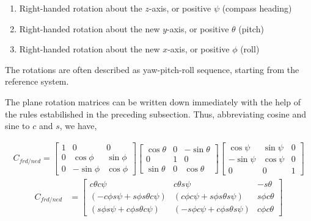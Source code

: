\begin{enumerate}
    \item Right-handed rotation about the \(z\)-axis, or positive \(\psi\) (compass heading)
    \item Right-handed rotation about the new \(y\)-axis, or positive \(\theta\) (pitch)
    \item Right-handed rotation about the new \(x\)-axis, or positive \(\phi\) (roll)
\end{enumerate}

The rotations are often described as yaw-pitch-roll sequence,
starting from the reference system.

The plane rotation matrices can be written down immediately with
the help of the rules estabilished in the preceding subsection.
Thus, abbreviating cosine and sine to \(c\) and \(s\), we have,

\begin{align*}
    C_{f\!r\!d\!/\!n\!e\!d} =
    \begin{bmatrix}
        1               &  0            &  0             \\
        0               &  \cos{\phi}   &  \sin{\phi}    \\
        0               & -\sin{\phi}   &  \cos{\phi}
    \end{bmatrix}
    \begin{bmatrix}
        \cos{ \theta}   &  0            & -\sin{\theta} \\
        0               &  1            &  0            \\
        \sin{ \theta}   &  0            &  \cos{\theta}
    \end{bmatrix}
    \begin{bmatrix}
        \cos{\psi}      &  \sin{\psi}   &  0             \\
       -\sin{\psi}      &  \cos{\psi}   &  0             \\
        0               &  0            &  1
    \end{bmatrix}
\end{align*}
\begin{align} \tag{1.3-10}
    C_{f\!r\!d\!/\!n\!e\!d} &=
    \begin{bmatrix}
        c\theta c\psi   & c\theta s\psi & -s\theta    \\
        \left(-c\phi s\psi + s\phi s\theta c\psi \right) 
        &  \left( c\phi c\psi + s\phi s\theta s\psi \right) 
        &  s\phi c\theta                                 \\
        \left( s\phi s\psi + c\phi s\theta c\psi \right) 
        &  \left( -s\phi c\psi + c\phi s\theta s\psi \right) 
        & c\phi c\theta
    \end{bmatrix}
\end{align}

